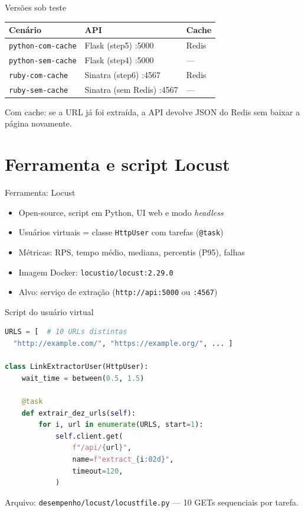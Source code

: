 \documentclass[aspectratio=169,11pt]{beamer}
\begin{document}
\begin{frame}{Versões sob teste}
  \small
  \begin{tabular}{@{}lll@{}}
    \toprule
    Cenário & API & Cache \\
    \midrule
    \texttt{python-com-cache} & Flask (step5) :5000 & Redis \\
    \texttt{python-sem-cache} & Flask (step4) :5000 & --- \\
    \texttt{ruby-com-cache} & Sinatra (step6) :4567 & Redis \\
    \texttt{ruby-sem-cache} & Sinatra (sem Redis) :4567 & --- \\
    \bottomrule
  \end{tabular}
  \vspace{0.6em}

  Com cache: se a URL já foi extraída, a API devolve JSON do Redis sem baixar a página novamente.
\end{frame}

\section{Ferramenta e script Locust}

\begin{frame}{Ferramenta: Locust}
  \begin{itemize}
    \item Open-source, script em Python, UI web e modo \emph{headless}
    \item Usuários virtuais = classe \texttt{HttpUser} com tarefas (\texttt{@task})
    \item Métricas: RPS, tempo médio, mediana, percentis (P95), falhas
    \item Imagem Docker: \texttt{locustio/locust:2.29.0}
    \item Alvo: serviço de extração (\texttt{http://api:5000} ou \texttt{:4567})
  \end{itemize}
\end{frame}

\begin{frame}[fragile]{Script do usuário virtual}
  \begin{lstlisting}[language=Python,basicstyle=\ttfamily\tiny]
URLS = [  # 10 URLs distintas
  "http://example.com/", "https://example.org/", ... ]

class LinkExtractorUser(HttpUser):
    wait_time = between(0.5, 1.5)

    @task
    def extrair_dez_urls(self):
        for i, url in enumerate(URLS, start=1):
            self.client.get(
                f"/api/{url}",
                name=f"extract_{i:02d}",
                timeout=120,
            )
  \end{lstlisting}
  \vspace{0.3em}
  {\small Arquivo: \texttt{desempenho/locust/locustfile.py} --- 10 GETs sequenciais por tarefa.}
\end{frame}
\end{document}
